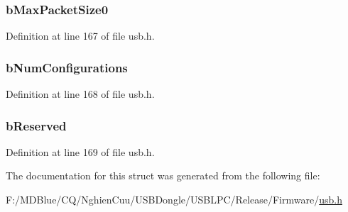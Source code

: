 \hypertarget{struct___u_s_b___d_e_v_i_c_e___q_u_a_l_i_f_i_e_r___d_e_s_c_r_i_p_t_o_r_aad07704534145b010921a7ca41a30edf}{
\subsubsection[{bMaxPacketSize0}]{ {\bf bMaxPacketSize0}}}
\label{struct___u_s_b___d_e_v_i_c_e___q_u_a_l_i_f_i_e_r___d_e_s_c_r_i_p_t_o_r_aad07704534145b010921a7ca41a30edf}


Definition at line 167 of file usb.h.

\hypertarget{struct___u_s_b___d_e_v_i_c_e___q_u_a_l_i_f_i_e_r___d_e_s_c_r_i_p_t_o_r_a6170c2c859a226f8dae80b59903e7ca2}{
\subsubsection[{bNumConfigurations}]{ {\bf bNumConfigurations}}}
\label{struct___u_s_b___d_e_v_i_c_e___q_u_a_l_i_f_i_e_r___d_e_s_c_r_i_p_t_o_r_a6170c2c859a226f8dae80b59903e7ca2}


Definition at line 168 of file usb.h.

\hypertarget{struct___u_s_b___d_e_v_i_c_e___q_u_a_l_i_f_i_e_r___d_e_s_c_r_i_p_t_o_r_aaf8f2b73c01880ceea844ddeae5e098e}{
\subsubsection[{bReserved}]{ {\bf bReserved}}}
\label{struct___u_s_b___d_e_v_i_c_e___q_u_a_l_i_f_i_e_r___d_e_s_c_r_i_p_t_o_r_aaf8f2b73c01880ceea844ddeae5e098e}


Definition at line 169 of file usb.h.



The documentation for this struct was generated from the following file:\begin{DoxyCompactItemize}
\item 
F:/MDBlue/CQ/NghienCuu/USBDongle/USBLPC/Release/Firmware/\hyperlink{usb_8h}{usb.h}\end{DoxyCompactItemize}
